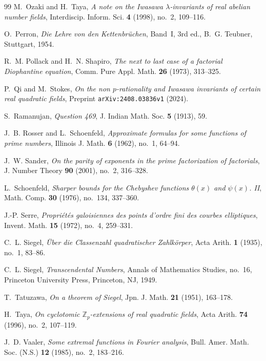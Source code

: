 \documentclass[11pt,reqno]{amsart}
\theoremstyle{remark}
\numberwithin{equation}{section}
\newcommand{\Z}{\mathbb{Z}}
\begin{document}
\begin{thebibliography}{99}
M.~Ozaki and H.~Taya, \emph{A note on the Iwasawa $\lambda$-invariants of real abelian number fields}, Interdiscip. Inform. Sci. \textbf{4} (1998), no.~2, 109--116.

O.~Perron, \emph{Die Lehre von den Kettenbr\"uchen}, Band~I, 3rd ed., B.~G. Teubner, Stuttgart, 1954.

R.~M. Pollack and H.~N. Shapiro, \emph{The next to last case of a factorial Diophantine equation}, Comm. Pure Appl. Math. \textbf{26} (1973), 313--325.

P.~Qi and M.~Stokes, \emph{On the non $p$-rationality and Iwasawa invariants of certain real quadratic fields}, Preprint \texttt{arXiv:2408.03836v1} (2024).

S.~Ramanujan, \emph{Question 469}, J. Indian Math. Soc. \textbf{5} (1913), 59.

J.~B. Rosser and L.~Schoenfeld, \emph{Approximate formulas for some functions of prime numbers}, Illinois J. Math. \textbf{6} (1962), no.~1, 64--94.

J.~W. Sander, \emph{On the parity of exponents in the prime factorization of factorials}, J. Number Theory \textbf{90} (2001), no.~2, 316--328.

L.~Schoenfeld, \emph{Sharper bounds for the Chebyshev functions $\theta(x)$ and $\psi(x)$. II}, Math. Comp. \textbf{30} (1976), no.~134, 337--360.

J.-P. Serre, \emph{Propri\'et\'es galoisiennes des points d'ordre fini des courbes elliptiques}, Invent. Math. \textbf{15} (1972), no.~4, 259--331.

C.~L. Siegel, \emph{\"Uber die Classenzahl quadratischer Zahlk\"orper}, Acta Arith. \textbf{1} (1935), no.~1, 83--86.

C.~L. Siegel, \emph{Transcendental Numbers}, Annals of Mathematics Studies, no.~16, Princeton University Press, Princeton, NJ, 1949.

T.~Tatuzawa, \emph{On a theorem of Siegel}, Jpn. J. Math. \textbf{21} (1951), 163--178.

H.~Taya, \emph{On cyclotomic $\Z_p$-extensions of real quadratic fields}, Acta Arith. \textbf{74} (1996), no.~2, 107--119.

J.~D. Vaaler, \emph{Some extremal functions in Fourier analysis}, Bull. Amer. Math. Soc. (N.S.) \textbf{12} (1985), no.~2, 183--216.


\end{thebibliography}
\end{document}
